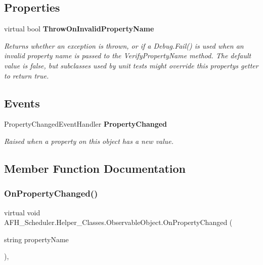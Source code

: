 \subsection*{Properties}
\begin{DoxyCompactItemize}
\item 
virtual bool \textbf{ Throw\+On\+Invalid\+Property\+Name}\hspace{0.3cm}{\ttfamily  [get]}
\begin{DoxyCompactList}\small\item\em Returns whether an exception is thrown, or if a Debug.\+Fail() is used when an invalid property name is passed to the Verify\+Property\+Name method. The default value is false, but subclasses used by unit tests might override this property\textquotesingle{}s getter to return true. \end{DoxyCompactList}\end{DoxyCompactItemize}
\subsection*{Events}
\begin{DoxyCompactItemize}
\item 
Property\+Changed\+Event\+Handler \textbf{ Property\+Changed}
\begin{DoxyCompactList}\small\item\em Raised when a property on this object has a new value. \end{DoxyCompactList}\end{DoxyCompactItemize}


\subsection{Member Function Documentation}
\mbox{\label{class_a_f_h___scheduler_1_1_helper___classes_1_1_observable_object_a49d86e90da59bd87569515e20a83766a}} 
\subsubsection{OnPropertyChanged()}
{\footnotesize\ttfamily virtual void A\+F\+H\+\_\+\+Scheduler.\+Helper\+\_\+\+Classes.\+Observable\+Object.\+On\+Property\+Changed (\begin{DoxyParamCaption}\item[{string}]{property\+Name }\end{DoxyParamCaption})\hspace{0.3cm}{\ttfamily [protected]}, {\ttfamily [virtual]}}



